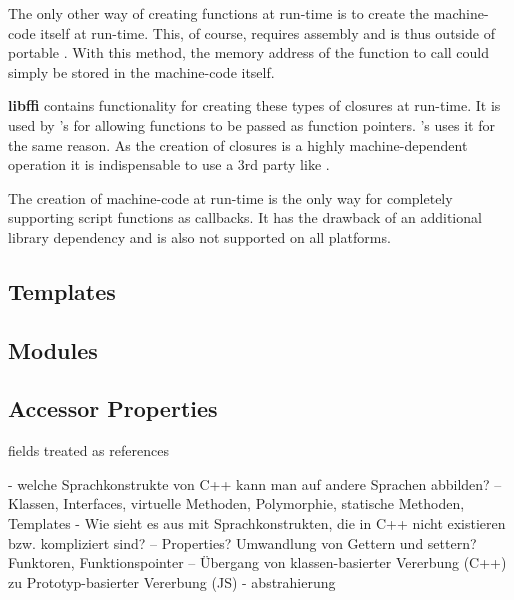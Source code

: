 The only other way of creating functions at run-time is to create the machine-code itself at run-time. This, of course, requires assembly and is thus outside of portable . With this method, the memory address of the  function to call could simply be stored in the machine-code itself.

\textbf{libffi} contains functionality for creating these types of closures at run-time. It is used by 's  for allowing  functions to be passed as  function pointers. 's  uses it for the same reason. As the creation of closures is a highly machine-dependent operation it is indispensable to use a 3rd party like .

The creation of machine-code at run-time is the only way for completely supporting script functions as callbacks. It has the drawback of an additional library dependency and is also not supported on all platforms.

\subsection{Templates}

\subsection{Modules}

\subsection{Accessor Properties}

fields treated as references







 - welche Sprachkonstrukte von C++ kann man auf andere Sprachen abbilden? 
 -- Klassen, Interfaces, virtuelle Methoden, Polymorphie, statische Methoden, Templates
 - Wie sieht es aus mit Sprachkonstrukten, die in C++ nicht existieren bzw. kompliziert sind?
 -- Properties? Umwandlung von Gettern und settern? Funktoren, Funktionspointer
 -- Übergang von klassen-basierter Vererbung (C++) zu Prototyp-basierter Vererbung (JS)
 - abstrahierung